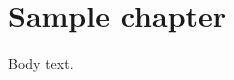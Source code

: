 \documentclass{unknown@class@no@binding}
\begin{document}
\chapter{Sample chapter}
Body text.
\end{document}
